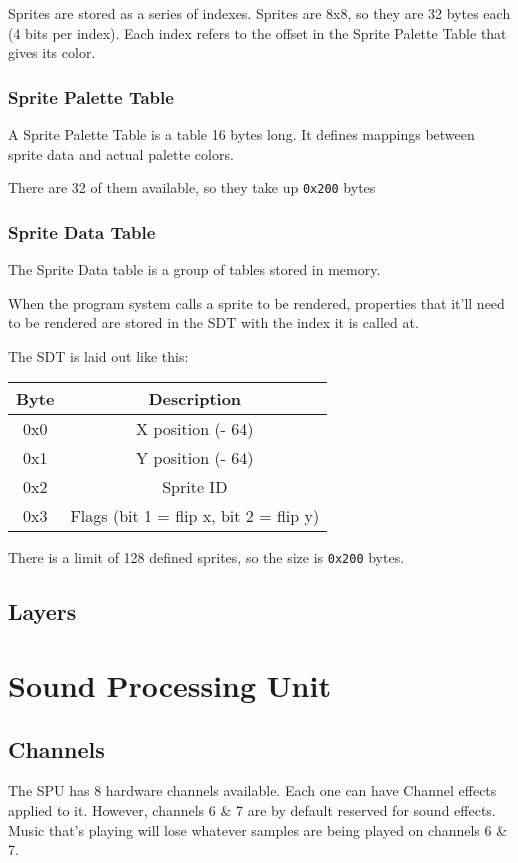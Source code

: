 \documentclass[10pt,a4paper]{article}
\def\tcode#1{\texttt{#1}}
\begin{document}
			Sprites are stored as a series of indexes. Sprites are 8x8, so they are 32 bytes each (4 bits per index). Each index refers to the offset in the Sprite Palette Table that gives its color.
			\subsubsection{Sprite Palette Table}
				A Sprite Palette Table is a table 16 bytes long. It defines mappings between sprite data and actual palette colors.
				
				There are 32 of them available, so they take up \tcode{0x200} bytes
			\subsubsection{Sprite Data Table}
				The Sprite Data table is a group of tables stored in memory. 
				
				When the program system calls a sprite to be rendered, properties that it'll need to be rendered are stored in the SDT with the index it is called at.
				
				The SDT is laid out like this:
				\begin{table}[h]
					\centering
					\begin{tabular}{|c|c|}
						\hline
						Byte & Description \\
						\hline
						0x0 & X position (- 64) \\
						0x1 & Y position (- 64) \\
						0x2 & Sprite ID \\
						0x3 & Flags (bit 1 = flip x, bit 2 = flip y) \\
						\hline
					\end{tabular}
				\end{table}
			
				There is a limit of 128 defined sprites, so the size is \tcode{0x200} bytes.
		\subsection{Layers}
		
		
	\section[SPU]{Sound Processing Unit}
		\subsection{Channels}
			The SPU has 8 hardware channels available. Each one can have Channel effects applied to it. However, channels 6 \& 7 are by default reserved for sound effects. Music that's playing will lose whatever samples are being played on channels 6 \& 7.
\end{document}
